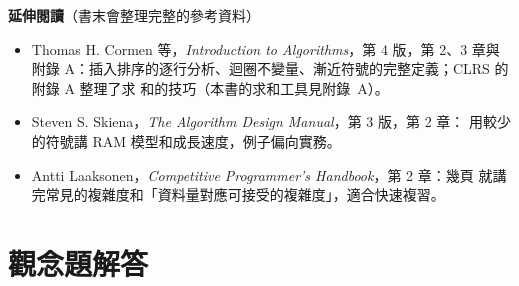 \textbf{延伸閱讀}（書末會整理完整的參考資料）

\begin{itemize}
\item Thomas H. Cormen 等，\textit{Introduction to Algorithms}，第 4 版，第 2、3
章與附錄 A：插入排序的逐行分析、迴圈不變量、漸近符號的完整定義；CLRS 的附錄 A 整理了求
和的技巧（本書的求和工具見附錄~A）。
\item Steven S. Skiena，\textit{The Algorithm Design Manual}，第 3 版，第 2 章：
用較少的符號講 RAM 模型和成長速度，例子偏向實務。
\item Antti Laaksonen，\textit{Competitive Programmer's Handbook}，第 2 章：幾頁
就講完常見的複雜度和「資料量對應可接受的複雜度」，適合快速複習。
\end{itemize}

\section*{觀念題解答}

